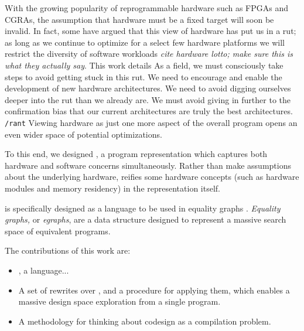 With the growing popularity
  of reprogrammable hardware
  such as FPGAs and CGRAs,
  the assumption that hardware
  must be a fixed target
  will soon be invalid.
In fact,
  some have argued
  that this view of hardware
  has put us in a rut;
  as long as we continue
  to optimize for 
  a select few hardware platforms
  we will restrict the diversity
  of software workloads 
  \textit{cite hardware lotto;
  make sure 
  this is 
  what they actually say}.
This work
  details
As a field,
  we must consciously take steps
  to avoid getting stuck in this rut.
We need to encourage
  and enable
  the development of
  new hardware architectures.
We need to avoid
  digging ourselves deeper
  into the rut
  than we already are.
We must avoid
  giving in further
  to the confirmation bias
  that our current architectures
  are truly the best architectures.
\texttt{/rant}
Viewing hardware
  as just one more aspect
  of the overall program
  opens an even wider space
  of potential optimizations.

To this end,
  we designed \g{},
  a program representation
  which captures both hardware
  and software
  concerns
  simultaneously.
Rather than make assumptions
  about the underlying hardware,
  \g{}
  reifies some hardware concepts
  (such as hardware modules
    and memory residency)
  in the representation itself.

\g{}
  is specifically designed
  as a language to be used
  in equality graphs \cite{egraph stuff}.
\textit{Equality graphs,}
  or \textit{egraphs},
  are a data structure
  designed to represent
  a massive search space
  of equivalent programs.

The contributions
  of this work are:
\begin{itemize}
\item \g{}, a language...
\item
  A set of rewrites over \g{},
  and a procedure for applying them,
  which enables a massive
  design space exploration
  from a single program.
\item
  A methodology
  for thinking about 
  \hwsw{} codesign
  as a compilation problem.
\end{itemize}